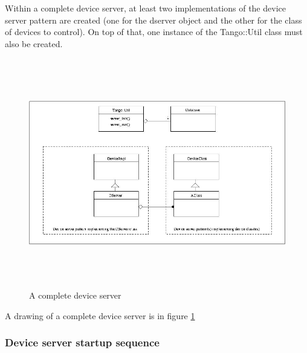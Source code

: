 Within a complete device server, at least two implementations of the
device server pattern are created (one for the dserver object and
the other for the class of devices to control). On top of that, one
instance of the Tango::Util class must also be created.
\begin{figure}
\begin{centering}
\includegraphics[width=14cm,height=10cm]{ds_writing/complete_server}
\par\end{centering}
\caption{A complete device server\label{completeDS}}
\end{figure}
 A drawing of a complete device server is in figure \ref{completeDS}

\subsubsection{Device server startup sequence\label{Server_startup}}

